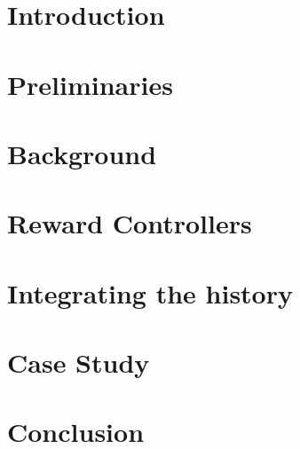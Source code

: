 \documentclass[12pt,twoside]{report}
\begin{document}
	\chapter{Introduction}
	
	
	\chapter{Preliminaries}
	
	
	\chapter{Background}
	
	
	\chapter{Reward Controllers}
	
	
	\chapter{Integrating the history}
	
	
	\chapter{Case Study}
		
	
	\chapter{Conclusion}
	
	
	
	
	

	\newpage
	
	
	
	
	
\end{document}
